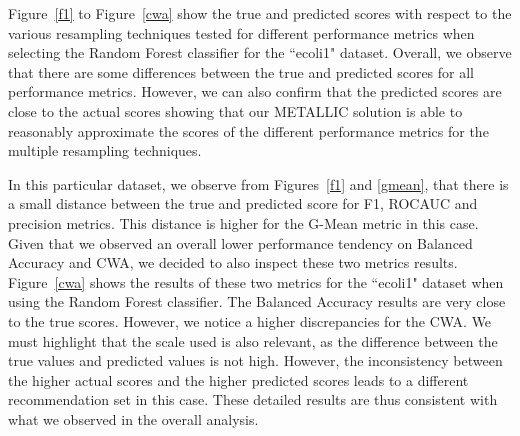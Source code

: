 \documentclass{article}
\begin{document}




Figure~\autoref{f1} to Figure~\autoref{cwa} show the true and predicted scores with respect to the various resampling techniques tested for different performance metrics when selecting the Random Forest classifier for the ``ecoli1" dataset. Overall, we observe that there are some differences between the true and predicted scores for all performance metrics. However, we can also confirm that the predicted scores are close to the actual scores showing that our METALLIC solution is able to reasonably approximate the scores of the different performance metrics for the multiple resampling techniques.


In this particular dataset, we observe from Figures~\autoref{f1} and \autoref{gmean}, that there is a small distance between the true and predicted score for F1, ROCAUC and precision metrics. This distance is higher for the G-Mean metric in this case. Given that we observed an overall lower performance tendency on Balanced Accuracy and CWA, we decided to also inspect these two metrics results. Figure~\autoref{cwa} shows the results of these two metrics for the ``ecoli1" dataset when using the Random Forest classifier. The Balanced Accuracy results are very close to the true scores. However, we notice a higher discrepancies for the CWA. We must highlight that the scale used is also relevant, as the difference between the true values and predicted values is not high. However, the inconsistency between the higher actual scores and the higher predicted scores leads to a different recommendation set in this case. 
These detailed results are thus consistent with what we observed in the overall analysis.

\end{document}
